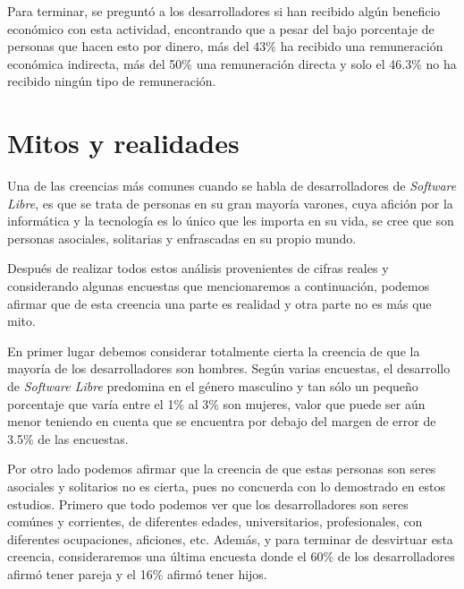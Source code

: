 Para terminar, se preguntó a los desarrolladores si han recibido algún beneficio económico con esta actividad, encontrando que a pesar del bajo porcentaje de personas que hacen esto por dinero, más del 43\% ha recibido una remuneración económica indirecta, más del 50\% una remuneración directa y solo el 46.3\% no ha recibido ningún tipo de remuneración.

\section{Mitos y realidades}

Una de las creencias más comunes cuando se habla de desarrolladores de \textit{Software Libre}, es que se trata de personas en su gran mayoría varones, cuya afición por la informática y la tecnología es lo único que les importa en su vida, se cree que son personas asociales, solitarias y enfrascadas en su propio mundo.

Después de realizar todos estos análisis provenientes de cifras reales y considerando algunas encuestas que mencionaremos a continuación, podemos afirmar que de esta creencia una parte es realidad y otra parte no es más que mito.

En primer lugar debemos considerar totalmente cierta la creencia de que la mayoría de los desarrolladores son hombres. Según varias encuestas, el desarrollo de \textit{Software Libre} predomina en el género masculino y tan sólo un pequeño porcentaje que varía entre el 1\% al 3\% son mujeres, valor que puede ser aún menor teniendo en cuenta que se encuentra por debajo del margen de error de 3.5\% de las encuestas.

Por otro lado podemos afirmar que la creencia de que estas personas son seres asociales y solitarios no es cierta, pues no concuerda con lo demostrado en estos estudios. Primero que todo podemos ver que los desarrolladores son seres comúnes y corrientes, de diferentes edades, universitarios, profesionales, con diferentes ocupaciones, aficiones, etc. Además, y para terminar de desvirtuar esta creencia, consideraremos una última encuesta donde el 60\% de los desarrolladores afirmó tener pareja y el 16\% afirmó tener hijos.
